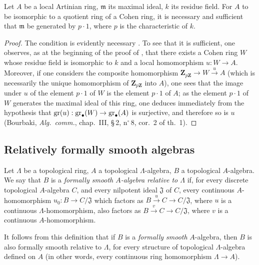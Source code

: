 \begin{proposition}[19.8.11]
\label{0.19.8.11}
Let $A$ be a local Artinian ring, $\mathfrak{m}$ its maximal ideal, $k$ its residue field.
For $A$ to be isomorphic to a quotient ring of a Cohen ring, it is necessary and sufficient that $\mathfrak{m}$ be generated by $p\cdot 1$, where $p$ is the characteristic of $k$.
\end{proposition}

\begin{proof}
The condition is evidently necessary .
To see that it is sufficient, one observes, as at the beginning of the proof of , that there exists a Cohen ring $W$ whose residue field is isomorphic to $k$ and a local homomorphism $u:W\to A$.
Moreover, if one considers the composite homomorphism $\mathbf{Z}_{p\mathbf{Z}}\to W\xrightarrow{u}A$ (which is necessarily the unique homomorphism of $\mathbf{Z}_{p\mathbf{Z}}$ into $A$), one sees that the image under $u$ of the element $p\cdot 1$ of $W$ is the element $p\cdot 1$ of $A$; as the element $p\cdot 1$ of $W$ generates the maximal ideal of this ring, one deduces immediately from the hypothesis that $\operatorname{gr}(u):\operatorname{gr}_\bullet(W)\to\operatorname{gr}_\bullet(A)$ is surjective, and therefore so is $u$ (Bourbaki, \emph{Alg.\ comm.}, chap.~III, \S\,2, n$^\circ$\,8, cor.~2 of th.~1).
\end{proof}

\subsection{Relatively formally smooth algebras}
\label{subsection:0.19.9}

\begin{definition}[19.9.1]
\label{0.19.9.1}
Let $\Lambda$ be a topological ring, $A$ a topological $\Lambda$-algebra, $B$ a topological $A$-algebra.
We say that $B$ is a \emph{formally smooth $A$-algebra relative to $\Lambda$} if, for every discrete topological $A$-algebra $C$, and every nilpotent ideal $\mathfrak{J}$ of $C$, every continuous $A$-homomorphism $u_0:B\to C/\mathfrak{J}$ which factors as $B\xrightarrow{u}C\to C/\mathfrak{J}$, where $u$ is a continuous $\Lambda$-homomorphism, also factors as $B\xrightarrow{v}C\to C/\mathfrak{J}$, where $v$ is a continuous $A$-homomorphism.
\end{definition}

It follows from this definition that if $B$ is a \emph{formally smooth} $A$-algebra, then $B$ is also formally smooth relative to $\Lambda$, for every structure of topological $\Lambda$-algebra defined on $A$ (in other words, every continuous ring homomorphism $\Lambda\to A$).

